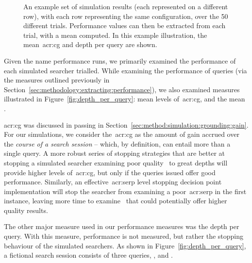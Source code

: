 \begin{figure}[t!]
    \centering
    \caption[Example of how an average of measures was computed]{An example set of simulation results (each represented on a different row), with each row representing the same configuration, over the 50 different trials. Performance values can then be extracted from each trial, with a mean computed. In this example illustration, the mean~\gls{acr:cg} and depth per query are shown.}
    \label{fig:example_sim_configuration}
\end{figure}

Given the name performance runs, we primarily examined the performance of each simulated searcher trialled. While examining the performance of queries (via the measures outlined previously in Section~\ref{sec:methodology:extracting:performance}), we also examined measures illustrated in Figure~\ref{fig:depth_per_query}: mean levels of~\gls{acr:cg}, and the mean .

\gls{acr:cg} was discussed in passing in Section~\ref{sec:method:simulation:grounding:gain}. For our simulations, we consider the~\gls{acr:cg} as the amount of gain accrued over the \emph{course of a search session} -- which, by definition, can entail more than a single query. A more robust series of stopping strategies that are better at stopping a simulated searcher examining poor quality~ to great depths will provide higher levels of~\gls{acr:cg}, but only if the queries issued offer good performance. Similarly, an effective~\gls{acr:serp} level stopping decision point implementation will stop the searcher from examining a poor~\gls{acr:serp} in the first instance, leaving more time to examine~ that could potentially offer higher quality results.

The other major measure used in our performance measures was the depth per query. With this measure, performance is not measured, but rather the stopping behaviour of the simulated searchers. As shown in Figure~\ref{fig:depth_per_query}, a fictional search session consists of three queries, ,  and .

